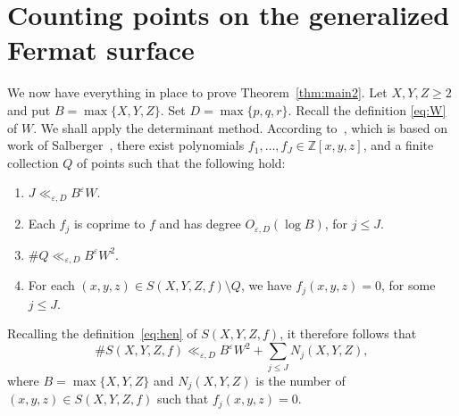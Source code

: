 \documentclass[a4paper,11pt,twoside,reqno]{amsart}
\theoremstyle{definition}
\theoremstyle{remark}
\numberwithin{equation}{section}
\newcommand\ve{\varepsilon}
\newcommand\Z{\mathbb{Z}}
\newcommand\1{\mathbf{1}}
\renewcommand{\leq}{\leqslant}
\renewcommand{\geq}{\geqslant}
\begin{document}
\section{Counting points on the generalized Fermat surface}

We now have everything in place to prove Theorem~\ref{thm:main2}. 
Let $X,Y,Z\geq 2$ and put $B=\max\{X,Y,Z\}$. Set $D=\max\{p,q,r\}$.
Recall the definition 
\eqref{eq:W} of $W$. We shall apply the determinant method.
According to~\cite[Theorem~1.1]{bv}, 
which is based on work of Salberger~\cite{saldet}, there exist polynomials
$f_1,\ldots, f_J\in \Z[x,y,z]$, 
and a finite collection $Q$ of points such that 
the following
hold:
\begin{enumerate}
	\item $J\ll_{\ve,D} B^\ve W $.
	\item
	Each $f_j$ is coprime to $f$ and has degree 
	$O_{\ve,D}(\log B)$, for $j\leq J$. 
	\item
	$\#Q\ll_{\ve,D} B^\ve W^{2}$.
	\item
	For each $(x,y,z)\in S(X,Y,Z,f)\setminus Q$, we have
	$f_j(x,y,z)=0$,
	for some $j\leq J$.
\end{enumerate}
Recalling the definition~\eqref{eq:hen} of 
$S(X,Y,Z,f)$, 
it therefore follows that 
\[
\#S(X,Y,Z,f)\ll_{\ve,D} B^\ve W^2+\sum_{j\leq J} N_j(X,Y,Z),
\]
where 
$B=\max\{X,Y,Z\}$ and 
$N_j(X,Y,Z)$ is the number of $(x,y,z)\in S(X,Y,Z,f)$ such that $f_j(x,y,z)=0$.
\end{document}

